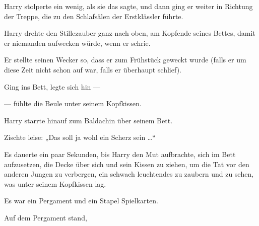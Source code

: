 Harry stolperte ein wenig, als sie das sagte, und dann ging er weiter in Richtung der Treppe, die zu den Schlafsälen der Erstklässler führte.

\later

Harry drehte den Stillezauber ganz nach oben, am Kopfende seines Bettes, damit er niemanden aufwecken würde, wenn er schrie.

Er stellte seinen Wecker so, dass er zum Frühstück geweckt wurde (falls er um diese Zeit nicht schon auf war, falls er überhaupt schlief).

Ging ins Bett, legte sich hin —

— fühlte die Beule unter seinem Kopfkissen.

Harry starrte hinauf zum Baldachin über seinem Bett.

Zischte leise:
„Das soll ja wohl ein Scherz sein …“

Es dauerte ein paar Sekunden, bis Harry den Mut aufbrachte, sich im Bett aufzusetzen, die Decke über sich und sein Kissen zu ziehen, um die Tat vor den anderen Jungen zu verbergen, ein schwach leuchtendes  zu zaubern und zu sehen, was unter seinem Kopfkissen lag.

Es war ein Pergament und ein Stapel Spielkarten.

Auf dem Pergament stand,

